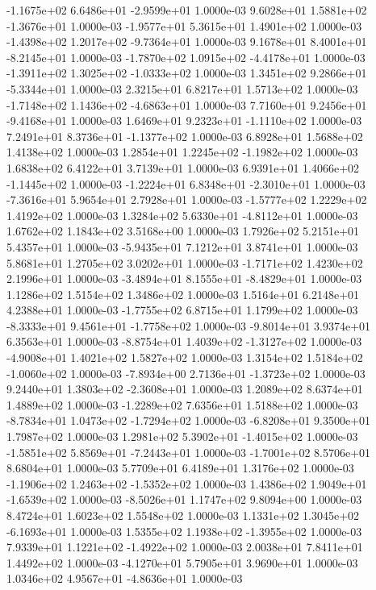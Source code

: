 -1.1675e+02  6.6486e+01 -2.9599e+01  1.0000e-03
 9.6028e+01  1.5881e+02 -1.3676e+01  1.0000e-03
-1.9577e+01  5.3615e+01  1.4901e+02  1.0000e-03
-1.4398e+02  1.2017e+02 -9.7364e+01  1.0000e-03
 9.1678e+01  8.4001e+01 -8.2145e+01  1.0000e-03
-1.7870e+02  1.0915e+02 -4.4178e+01  1.0000e-03
-1.3911e+02  1.3025e+02 -1.0333e+02  1.0000e-03
 1.3451e+02  9.2866e+01 -5.3344e+01  1.0000e-03
2.3215e+01 6.8217e+01 1.5713e+02  1.0000e-03
-1.7148e+02  1.1436e+02 -4.6863e+01  1.0000e-03
 7.7160e+01  9.2456e+01 -9.4168e+01  1.0000e-03
 1.6469e+01  9.2323e+01 -1.1110e+02  1.0000e-03
 7.2491e+01  8.3736e+01 -1.1377e+02  1.0000e-03
6.8928e+01 1.5688e+02 1.4138e+02  1.0000e-03
 1.2854e+01  1.2245e+02 -1.1982e+02  1.0000e-03
1.6838e+02 6.4122e+01 3.7139e+01  1.0000e-03
 6.9391e+01  1.4066e+02 -1.1445e+02  1.0000e-03
-1.2224e+01  6.8348e+01 -2.3010e+01  1.0000e-03
-7.3616e+01  5.9654e+01  2.7928e+01  1.0000e-03
-1.5777e+02  1.2229e+02  1.4192e+02  1.0000e-03
 1.3284e+02  5.6330e+01 -4.8112e+01  1.0000e-03
1.6762e+02 1.1843e+02 3.5168e+00  1.0000e-03
1.7926e+02 5.2151e+01 5.4357e+01  1.0000e-03
-5.9435e+01  7.1212e+01  3.8741e+01  1.0000e-03
5.8681e+01 1.2705e+02 3.0202e+01  1.0000e-03
-1.7171e+02  1.4230e+02  2.1996e+01  1.0000e-03
-3.4894e+01  8.1555e+01 -8.4829e+01  1.0000e-03
1.1286e+02 1.5154e+02 1.3486e+02  1.0000e-03
1.5164e+01 6.2148e+01 4.2388e+01  1.0000e-03
-1.7755e+02  6.8715e+01  1.1799e+02  1.0000e-03
-8.3333e+01  9.4561e+01 -1.7758e+02  1.0000e-03
-9.8014e+01  3.9374e+01  6.3563e+01  1.0000e-03
-8.8754e+01  1.4039e+02 -1.3127e+02  1.0000e-03
-4.9008e+01  1.4021e+02  1.5827e+02  1.0000e-03
 1.3154e+02  1.5184e+02 -1.0060e+02  1.0000e-03
-7.8934e+00  2.7136e+01 -1.3723e+02  1.0000e-03
 9.2440e+01  1.3803e+02 -2.3608e+01  1.0000e-03
1.2089e+02 8.6374e+01 1.4889e+02  1.0000e-03
-1.2289e+02  7.6356e+01  1.5188e+02  1.0000e-03
-8.7834e+01  1.0473e+02 -1.7294e+02  1.0000e-03
-6.8208e+01  9.3500e+01  1.7987e+02  1.0000e-03
 1.2981e+02  5.3902e+01 -1.4015e+02  1.0000e-03
-1.5851e+02  5.8569e+01 -7.2443e+01  1.0000e-03
-1.7001e+02  8.5706e+01  8.6804e+01  1.0000e-03
5.7709e+01 6.4189e+01 1.3176e+02  1.0000e-03
-1.1906e+02  1.2463e+02 -1.5352e+02  1.0000e-03
 1.4386e+02  1.9049e+01 -1.6539e+02  1.0000e-03
-8.5026e+01  1.1747e+02  9.8094e+00  1.0000e-03
8.4724e+01 1.6023e+02 1.5548e+02  1.0000e-03
 1.1331e+02  1.3045e+02 -6.1693e+01  1.0000e-03
 1.5355e+02  1.1938e+02 -1.3955e+02  1.0000e-03
 7.9339e+01  1.1221e+02 -1.4922e+02  1.0000e-03
2.0038e+01 7.8411e+01 1.4492e+02  1.0000e-03
-4.1270e+01  5.7905e+01  3.9690e+01  1.0000e-03
 1.0346e+02  4.9567e+01 -4.8636e+01  1.0000e-03
